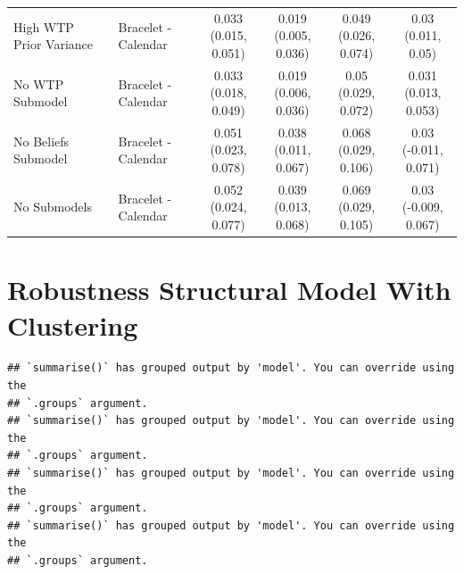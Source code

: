 \documentclass[
]{article}
\begin{document}
\begin{table}
{\begin{tabular}[t]{llcccc}
High WTP Prior Variance & Bracelet - Calendar & \makecell[c]{0.033\\(0.015, 0.051)} & \makecell[c]{0.019\\(0.005, 0.036)} & \makecell[c]{0.049\\(0.026, 0.074)} & \makecell[c]{0.03\\(0.011, 0.05)}\\
No WTP Submodel & Bracelet - Calendar & \makecell[c]{0.033\\(0.018, 0.049)} & \makecell[c]{0.019\\(0.006, 0.036)} & \makecell[c]{0.05\\(0.029, 0.072)} & \makecell[c]{0.031\\(0.013, 0.053)}\\
No Beliefs Submodel & Bracelet - Calendar & \makecell[c]{0.051\\(0.023, 0.078)} & \makecell[c]{0.038\\(0.011, 0.067)} & \makecell[c]{0.068\\(0.029, 0.106)} & \makecell[c]{0.03\\(-0.011, 0.071)}\\
No Submodels & Bracelet - Calendar & \makecell[c]{0.052\\(0.024, 0.077)} & \makecell[c]{0.039\\(0.013, 0.068)} & \makecell[c]{0.069\\(0.029, 0.105)} & \makecell[c]{0.03\\(-0.009, 0.067)}\\
\bottomrule
\end{tabular}}
\end{table}

\section{Robustness Structural Model With
Clustering}\label{robustness-structural-model-with-clustering}

\begin{verbatim}
## `summarise()` has grouped output by 'model'. You can override using the
## `.groups` argument.
## `summarise()` has grouped output by 'model'. You can override using the
## `.groups` argument.
## `summarise()` has grouped output by 'model'. You can override using the
## `.groups` argument.
## `summarise()` has grouped output by 'model'. You can override using the
## `.groups` argument.
\end{verbatim}
\end{document}

